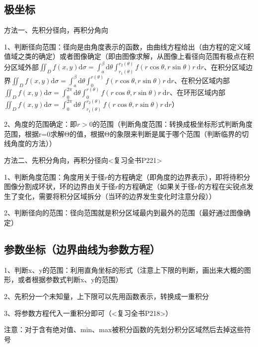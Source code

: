 \subsection{极坐标}

方法一、先积分径向，再积分角向

1、判断径向范围：径向是由角度表示的函数，由曲线方程给出（由方程的定义域值域之类的确定）或者图像确定（即由图像求解，从图像上看径向范围有极点在积分区域外部$ \iint_{D} f(x, y) \mathrm{d} \sigma=\int_{a}^{\beta} \mathrm{d} \theta \int_{r_{1}(\theta)}^{r_{2}(\theta)} f(r \cos \theta, r \sin \theta) r \mathrm{~d} r $、在积分区域边界$ \iint_{D} f(x, y) \mathrm{d} \sigma=\int_{a}^{\beta} \mathrm{d} \theta \int_{0}^{r(\theta)} f(r \cos \theta, r \sin \theta) r \mathrm{~d} r $、在积分区域内部$ \iint_{D} f(x, y) \mathrm{d} \sigma=\int_{0}^{2 \pi} \mathrm{d} \theta \int_{0}^{r(\theta)} f(r \cos \theta, r \sin \theta) r \mathrm{~d} r $、在环形区域内部$ \iint_{D} f(x, y) \mathrm{d} \sigma=\int_{0}^{2 \pi} \mathrm{d} \theta \int_{r_{1}(\theta)}^{r_{2}(\theta)} f(r \cos \theta, r \sin \theta) r \mathrm{~d} r $）

2、角度的范围确定：即$ r > 0  $的范围（判断角度范围：转换成极坐标形式判断角度范围，根据r=0求解Θ的值，根据Θ的象限来判断是属于哪个范围（判断临界的切线角度的方法））

方法二、先积分角向，再积分径向<复习全书P221>

1、判断角度范围：角度用关于径$ r $的方程确定（即角度的边界表示），即将待积分图像分割成环状，环的边界由关于径$ r $的方程确定（如果关于径$ r $的方程在尖锐点发生了变化，需要将积分区域拆分（当环的边界发生变化时注意分段））

2、判断径向的范围：径向范围就是积分区域最内到最外的范围（最好通过图像确定）



\subsection{参数坐标（边界曲线为参数方程）}

1、判断x、y的范围：利用直角坐标的形式（注意上下限的判断，画出来大概的图形，或者根据参数式判断x、y的范围）

2、先积分一个未知量，上下限可以先用函数表示，转换成一重积分

3、将参数方程代入一重积分即可（<复习全书P218>）



注意：对于含有绝对值、min、max被积分函数的先划分积分区域然后去掉这些符号

